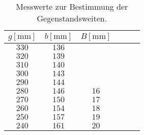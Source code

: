 \begin{table}[htp]
	\begin{center}
	\caption{Messwerte zur Bestimmung der Gegenstandsweiten.}
	\label{tab:a}
		\begin{tabular}{cccccc}
			\toprule
			{$g[\si{\milli\metre}]$} & {$b[\si{\milli\metre}]$} & {$B[\si{\milli\metre}]$}\\
			\midrule
			$330$ & $136$ & \\
			$320$ & $139$ & \\
			$310$ & $140$ & \\
			$300$ & $143$ & \\
			$290$ & $144$ & \\
			$280$ & $146$ & $16$\\
			$270$ & $150$ & $17$\\
			$260$ & $154$ & $18$\\
			$250$ & $157$ & $19$\\
			$240$ & $161$ & $20$\\
			\bottomrule
		\end{tabular}
	\end{center}
\end{table}
